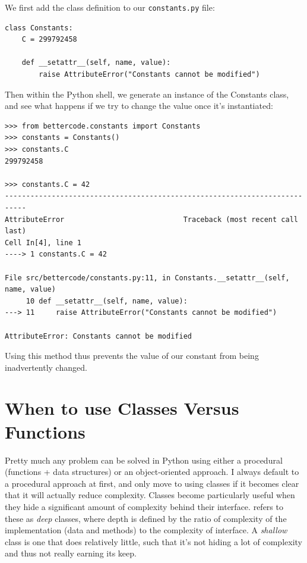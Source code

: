 We first add the class definition to our \texttt{constants.py} file:

\begin{lstlisting}[style=Python]
class Constants:
    C = 299792458

    def __setattr__(self, name, value):
        raise AttributeError("Constants cannot be modified")
\end{lstlisting}

Then within the Python shell, we generate an instance of the Constants class, and see what happens if we try to change the value once it's instantiated:

\begin{lstlisting}[style=repl]
>>> from bettercode.constants import Constants
>>> constants = Constants()
>>> constants.C
299792458

>>> constants.C = 42
---------------------------------------------------------------------------
AttributeError                            Traceback (most recent call last)
Cell In[4], line 1
----> 1 constants.C = 42

File src/bettercode/constants.py:11, in Constants.__setattr__(self, name, value)
     10 def __setattr__(self, name, value):
---> 11     raise AttributeError("Constants cannot be modified")

AttributeError: Constants cannot be modified
\end{lstlisting}

Using this method thus prevents the value of our constant from being inadvertently changed.

\section{When to use Classes Versus Functions}

Pretty much any problem can be solved in Python using either a procedural (functions + data structures) or an object-oriented approach.  I always default to a procedural approach at first, and only move to using classes if it becomes clear that it will actually reduce complexity.  Classes become particularly useful when they hide a significant amount of complexity behind their interface.  \cite{Ousterhout:2021aa} refers to these as \textit{deep} classes, where depth is defined by the ratio of complexity of the implementation (data and methods) to the complexity of interface.  A \textit{shallow} class is one that does relatively little, such that it's not hiding a lot of complexity and thus not really earning its keep.  

